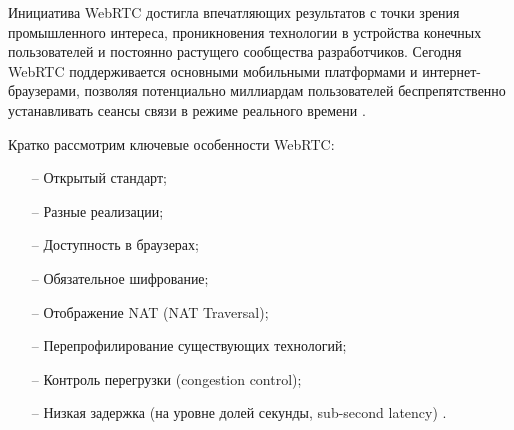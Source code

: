 
Инициатива WebRTC достигла впечатляющих результатов с точки зрения промышленного интереса, проникновения технологии в устройства конечных пользователей и постоянно растущего сообщества разработчиков. Сегодня WebRTC поддерживается основными мобильными платформами и интернет-браузерами, позволяя потенциально миллиардам пользователей беспрепятственно устанавливать сеансы связи в режиме реального времени \cite{v2}.

Кратко рассмотрим ключевые особенности WebRTC:
\begin{itemize}
	\item[--] Открытый стандарт;
	\item[--] Разные реализации;
	\item[--] Доступность в браузерах;
        \item[--] Обязательное шифрование;
        \item[--] Отображение NAT (NAT Traversal);
        \item[--] Перепрофилирование существующих технологий;
        \item[--] Контроль перегрузки (congestion control);
        \item[--] Низкая задержка (на уровне долей секунды, sub-second latency) \cite{v3}.
\end{itemize}

\pagebreak
